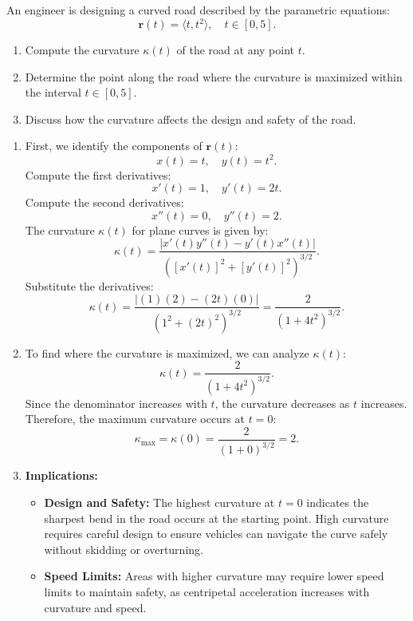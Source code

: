 \vspace{1.3em}

\exampleline
\begin{example}
An engineer is designing a curved road described by the parametric equations:
\[
\mathbf{r}(t) = \langle t, t^2 \rangle, \quad t \in [0, 5].
\]
\begin{enumerate}
    \item Compute the curvature \( \kappa(t) \) of the road at any point \( t \).
    \item Determine the point along the road where the curvature is maximized within the interval \( t \in [0, 5] \).
    \item Discuss how the curvature affects the design and safety of the road.
\end{enumerate}

\begin{solution}
\begin{enumerate}
    \item First, we identify the components of \( \mathbf{r}(t) \):
    \[
    x(t) = t, \quad y(t) = t^2.
    \]
    Compute the first derivatives:
    \[
    x'(t) = 1, \quad y'(t) = 2t.
    \]
    Compute the second derivatives:
    \[
    x''(t) = 0, \quad y''(t) = 2.
    \]
    The curvature \( \kappa(t) \) for plane curves is given by:
    \[
    \kappa(t) = \frac{|x'(t) y''(t) - y'(t) x''(t)|}{\left( [x'(t)]^2 + [y'(t)]^2 \right)^{3/2}}.
    \]
    Substitute the derivatives:
    \[
    \kappa(t) = \frac{| (1)(2) - (2t)(0) |}{\left( 1^2 + (2t)^2 \right)^{3/2}} = \frac{2}{\left( 1 + 4t^2 \right)^{3/2}}.
    \]
    \item To find where the curvature is maximized, we can analyze \( \kappa(t) \):
    \[
    \kappa(t) = \frac{2}{\left( 1 + 4t^2 \right)^{3/2}}.
    \]
    Since the denominator increases with \( t \), the curvature decreases as \( t \) increases. Therefore, the maximum curvature occurs at \( t = 0 \):
    \[
    \kappa_{\text{max}} = \kappa(0) = \frac{2}{(1 + 0)^{3/2}} = 2.
    \]
    \item \textbf{Implications:}
    \begin{itemize}
        \item \textbf{Design and Safety:} The highest curvature at \( t = 0 \) indicates the sharpest bend in the road occurs at the starting point. High curvature requires careful design to ensure vehicles can navigate the curve safely without skidding or overturning.
        \item \textbf{Speed Limits:} Areas with higher curvature may require lower speed limits to maintain safety, as centripetal acceleration increases with curvature and speed.

\end{itemize}
\end{enumerate}
\end{solution}
\end{example}
